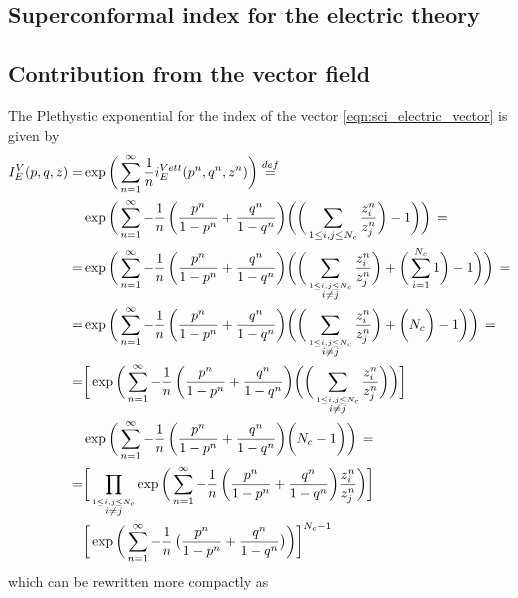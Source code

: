 \begin{appendices}
\chapter{Superconformal index for the electric theory}
\label{appendix:index_electric}

\section{Contribution from the vector field}
The Plethystic exponential for the index of the vector \eqref{eqn:sci_electric_vector} is given by
\begin{equation}
\begin{aligned}
I_E^V(p,q,z) = &\exp \bigg( \sum_{n=1}^{\infty} {1 \over n} i_E^{Vett} (p^n,q^n,z^n) \bigg) \overset{def}{=} \\
 &\exp \bigg( \sum_{n=1}^{\infty} - {1 \over n} \, \bigg( {p^n \over 1-p^n} + {q^n \over 1-q^n} \bigg)  \bigg(\bigg( \sum_{ 1 \leq i,j \leq N_c}  {z_i^n \over z_j^n}  \bigg)- 1 \bigg) \bigg) \, = \\
 =&\exp \bigg( \sum_{n=1}^{\infty} - {1 \over n} \, \bigg( {p^n \over 1-p^n} + {q^n \over 1-q^n} \bigg)  \bigg( \bigg( \sum_{\overset{ 1 \leq i,j \leq N_c}{i \neq j}}  {z_i^n \over z_j^n} \bigg) + \bigg( \sum_{i=1}^{N_c} 1 \bigg)- 1 \bigg) \bigg) \, = \\
  =&\exp \bigg( \sum_{n=1}^{\infty} - {1 \over n} \, \bigg( {p^n \over 1-p^n} + {q^n \over 1-q^n} \bigg)  \bigg( \bigg( \sum_{\overset{ 1 \leq i,j \leq N_c}{i \neq j}}  {z_i^n \over z_j^n} \bigg) + \bigg( N_c \bigg)- 1 \bigg) \bigg) \, = \\
    =&
    \bigg[ \exp \bigg( \sum_{n=1}^{\infty} - {1 \over n} \, \bigg( {p^n \over 1-p^n} + {q^n \over 1-q^n} \bigg)  \bigg( \bigg( \sum_{\overset{ 1 \leq i,j \leq N_c}{i \neq j}}  {z_i^n \over z_j^n} \bigg) \bigg)\bigg] \\
	&    \exp \bigg( \sum_{n=1}^{\infty} - {1 \over n} \, \bigg( {p^n \over 1-p^n} + {q^n \over 1-q^n} \bigg)  \bigg( N_c - 1 \bigg) \bigg) \, = 
\\
=& \bigg[\prod_{\overset{ 1 \leq i,j \leq N_c}{i\neq j}} \exp \bigg( \sum_{n=1}^{\infty} - {1 \over n} \, \bigg( {p^n \over 1-p^n} + {q^n \over 1-q^n} \bigg)   {z_i^n \over z_j^n}\bigg) \bigg] \\
&\bigg[ \exp \bigg( \sum_{n=1}^{\infty} - {1 \over n} \, \big( {p^n \over 1-p^n} + {q^n \over 1-q^n} \big) \bigg) \bigg] ^{N_c-1}
\end{aligned}
\end{equation}
which can be rewritten more compactly as

\end{appendices}
